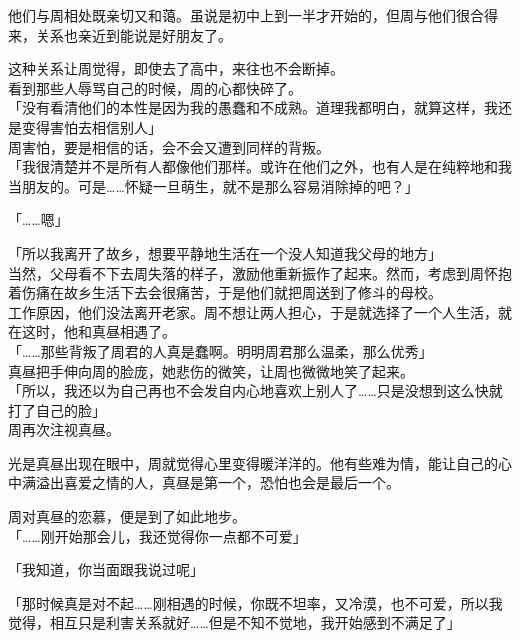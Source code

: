 他们与周相处既亲切又和蔼。虽说是初中上到一半才开始的，但周与他们很合得来，关系也亲近到能说是好朋友了。

这种关系让周觉得，即使去了高中，来往也不会断掉。\\

看到那些人辱骂自己的时候，周的心都快碎了。\\

「没有看清他们的本性是因为我的愚蠢和不成熟。道理我都明白，就算这样，我还是变得害怕去相信别人」\\

周害怕，要是相信的话，会不会又遭到同样的背叛。\\

「我很清楚并不是所有人都像他们那样。或许在他们之外，也有人是在纯粹地和我当朋友的。可是……怀疑一旦萌生，就不是那么容易消除掉的吧？」

「……嗯」

「所以我离开了故乡，想要平静地生活在一个没人知道我父母的地方」\\

当然，父母看不下去周失落的样子，激励他重新振作了起来。然而，考虑到周怀抱着伤痛在故乡生活下去会很痛苦，于是他们就把周送到了修斗的母校。\\

工作原因，他们没法离开老家。周不想让两人担心，于是就选择了一个人生活，就在这时，他和真昼相遇了。\\

「……那些背叛了周君的人真是蠢啊。明明周君那么温柔，那么优秀」\\

真昼把手伸向周的脸庞，她悲伤的微笑，让周也微微地笑了起来。\\

「所以，我还以为自己再也不会发自内心地喜欢上别人了……只是没想到这么快就打了自己的脸」\\

周再次注视真昼。

光是真昼出现在眼中，周就觉得心里变得暖洋洋的。他有些难为情，能让自己的心中满溢出喜爱之情的人，真昼是第一个，恐怕也会是最后一个。

周对真昼的恋慕，便是到了如此地步。\\

「……刚开始那会儿，我还觉得你一点都不可爱」

「我知道，你当面跟我说过呢」

「那时候真是对不起……刚相遇的时候，你既不坦率，又冷漠，也不可爱，所以我觉得，相互只是利害关系就好……但是不知不觉地，我开始感到不满足了」\\

